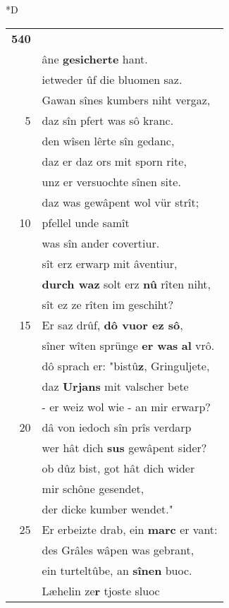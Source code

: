 \documentclass[8pt,a4paper,notitlepage]{article}
\begin{document}
\begin{table}[ht]
\begin{minipage}[t]{0.5\linewidth}
\small
\begin{center}*D
\end{center}
\begin{tabular}{rl}
\textbf{540} & \textbf{\begin{large}Û\end{large}f liez er doch} den wîgant\\ 
 & âne \textbf{gesicherte} hant.\\ 
 & ietweder ûf die bluomen saz.\\ 
 & Gawan sînes kumbers niht vergaz,\\ 
5 & daz sîn pfert was sô kranc.\\ 
 & den wîsen lêrte sîn gedanc,\\ 
 & daz er daz ors mit sporn rite,\\ 
 & unz er versuochte sînen site.\\ 
 & daz was gewâpent wol vür strît;\\ 
10 & pfellel unde samît\\ 
 & was sîn ander covertiur.\\ 
 & sît erz erwarp mit âventiur,\\ 
 & \textbf{durch waz} solt erz \textbf{nû} rîten niht,\\ 
 & sît ez ze rîten im geschiht?\\ 
15 & Er saz drûf, \textbf{dô vuor ez sô},\\ 
 & sîner wîten sprünge \textbf{er was} \textbf{al} vrô.\\ 
 & dô sprach er: "bistû\textbf{z}, Gringuljete,\\ 
 & daz \textbf{Urjans} mit valscher bete\\ 
 & - er weiz wol wie - an mir erwarp?\\ 
20 & dâ von iedoch sîn prîs verdarp\\ 
 & wer hât dich \textbf{sus} gewâpent sider?\\ 
 & ob dûz bist, got hât dich wider\\ 
 & mir schône gesendet,\\ 
 & der dicke kumber wendet."\\ 
25 & Er erbeizte drab, ein \textbf{marc} er vant:\\ 
 & des Grâles wâpen was gebrant,\\ 
 & ein turteltûbe, an \textbf{sînen} buoc.\\ 
 & Læhelin ze\textbf{r} tjoste sluoc\\ 

\end{tabular}
\end{minipage}
\end{table}
\end{document}
